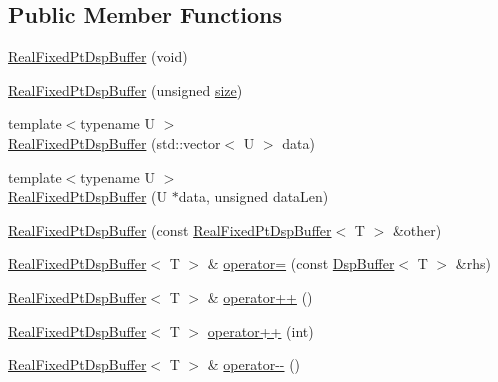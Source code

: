 \subsection*{Public Member Functions}
\begin{DoxyCompactItemize}
\item 
\hyperlink{class_smart_dsp_1_1_real_fixed_pt_dsp_buffer_ae3c3dff095c4fccdf05e91232c83ee9e}{Real\+Fixed\+Pt\+Dsp\+Buffer} (void)
\item 
\hyperlink{class_smart_dsp_1_1_real_fixed_pt_dsp_buffer_a3675f6676a342a7ca860fc8dc7ecc789}{Real\+Fixed\+Pt\+Dsp\+Buffer} (unsigned \hyperlink{class_smart_dsp_1_1_dsp_buffer_af931c57c26c1f459cae47ca4b249d402}{size})
\item 
{\footnotesize template$<$typename U $>$ }\\\hyperlink{class_smart_dsp_1_1_real_fixed_pt_dsp_buffer_a1338271bd75f8f668d703dece1957931}{Real\+Fixed\+Pt\+Dsp\+Buffer} (std\+::vector$<$ U $>$ data)
\item 
{\footnotesize template$<$typename U $>$ }\\\hyperlink{class_smart_dsp_1_1_real_fixed_pt_dsp_buffer_a3a0028bd8744466850067d580c6bbf18}{Real\+Fixed\+Pt\+Dsp\+Buffer} (U $\ast$data, unsigned data\+Len)
\item 
\hyperlink{class_smart_dsp_1_1_real_fixed_pt_dsp_buffer_ae07175e7317ee6451e9614d414832399}{Real\+Fixed\+Pt\+Dsp\+Buffer} (const \hyperlink{class_smart_dsp_1_1_real_fixed_pt_dsp_buffer}{Real\+Fixed\+Pt\+Dsp\+Buffer}$<$ T $>$ \&other)
\item 
\hyperlink{class_smart_dsp_1_1_real_fixed_pt_dsp_buffer}{Real\+Fixed\+Pt\+Dsp\+Buffer}$<$ T $>$ \& \hyperlink{class_smart_dsp_1_1_real_fixed_pt_dsp_buffer_a64978f7aadb02d9832cda903e2540341}{operator=} (const \hyperlink{class_smart_dsp_1_1_dsp_buffer}{Dsp\+Buffer}$<$ T $>$ \&rhs)
\item 
\hyperlink{class_smart_dsp_1_1_real_fixed_pt_dsp_buffer}{Real\+Fixed\+Pt\+Dsp\+Buffer}$<$ T $>$ \& \hyperlink{class_smart_dsp_1_1_real_fixed_pt_dsp_buffer_a27dc913f1d7059fbc2b574a0ee5d6d65}{operator++} ()
\item 
\hyperlink{class_smart_dsp_1_1_real_fixed_pt_dsp_buffer}{Real\+Fixed\+Pt\+Dsp\+Buffer}$<$ T $>$ \hyperlink{class_smart_dsp_1_1_real_fixed_pt_dsp_buffer_a8add599d8a19aa8641679485046cf1d2}{operator++} (int)
\item 
\hyperlink{class_smart_dsp_1_1_real_fixed_pt_dsp_buffer}{Real\+Fixed\+Pt\+Dsp\+Buffer}$<$ T $>$ \& \hyperlink{class_smart_dsp_1_1_real_fixed_pt_dsp_buffer_a9c06942aa4976915810cf8e026b3a02a}{operator-\/-\/} ()

\end{DoxyCompactItemize}
